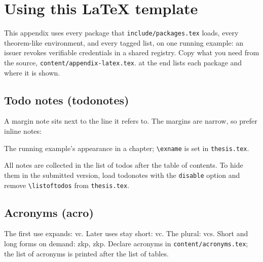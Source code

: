 \clearpage\section{Using this \LaTeX{} template}\label{app:latex}
This appendix uses every package that \texttt{include/packages.tex} loads, every theorem-like environment, and every tagged list, on one running example: an issuer revokes verifiable credentials in a shared registry.
Copy what you need from the source, \texttt{content/appendix-latex.tex}.
 at the end lists each package and where it is shown.

\subsection{Todo notes (todonotes)}\label{app:latex:todo}
A margin note sits next to the line it refers to.
The margins are narrow, so prefer inline notes:
\begin{runningexample}[a box]
The running example's appearance in a chapter; \texttt{\textbackslash exname} is set in \texttt{thesis.tex}.
\end{runningexample}

All notes are collected in the list of todos after the table of contents.
To hide them in the submitted version, load todonotes with the \texttt{disable} option and remove \texttt{\textbackslash listoftodos} from \texttt{thesis.tex}.

\subsection{Acronyms (acro)}\label{app:latex:acro}
The first use expands: \ac{vc}. Later uses stay short: \ac{vc}. The plural: \acp{vc}.
Short and long forms on demand: \acs{zkp}, \acl{zkp}.
Declare acronyms in \texttt{content/acronyms.tex}; the list of acronyms is printed after the list of tables.

